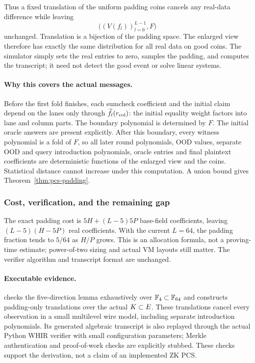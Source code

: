 Thus a fixed translation of the uniform padding coins cancels any real-data difference while leaving
\[
 \bigl((V(f_l))_{l=0}^{L-1},F\bigr)
\]
unchanged. Translation is a bijection of the padding space. The enlarged view therefore has exactly the same distribution for all real data on good coins. The simulator simply sets the real entries to zero, samples the padding, and computes the transcript; it need not detect the good event or solve linear systems.

\paragraph{Why this covers the actual messages.} Before the first fold finishes, each sumcheck coefficient and the initial claim depend on the lanes only through $\widetilde{f}_l(r_{\mathrm{col}})$: the initial equality weight factors into lane and column parts. The boundary polynomial is determined by $F$. The initial oracle answers are present explicitly. After this boundary, every witness polynomial is a fold of $F$, so all later round polynomials, OOD values, separate OOD and query introduction polynomials, oracle entries and final plaintext coefficients are deterministic functions of the enlarged view and the coins. Statistical distance cannot increase under this computation. A union bound gives Theorem~\ref{thm:pcs-padding}.

\subsubsection{Cost, verification, and the remaining gap}

The exact padding cost is $5H+(L-5)5P$ base-field coefficients, leaving $(L-5)(H-5P)$ real coefficients. With the current $L=64$, the padding fraction tends to $5/64$ as $H/P$ grows. This is an allocation formula, not a proving-time estimate; power-of-two sizing and actual VM layouts still matter. The verifier algorithm and transcript format are unchanged.

\paragraph{Executable evidence.}  checks the five-direction lemma exhaustively over $\mathbb{F}_4\subset\mathbb{F}_{64}$ and constructs padding-only translations over the actual $K\subset E$. These translations cancel every observation in a small multilevel wire model, including separate introduction polynomials. Its generated algebraic transcript is also replayed through the actual Python WHIR verifier with small configuration parameters; Merkle authentication and proof-of-work checks are explicitly stubbed. These checks support the derivation, not a claim of an implemented ZK PCS.

